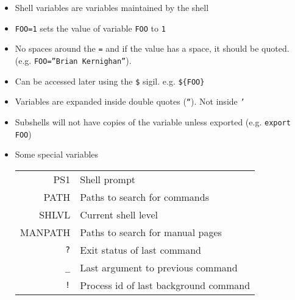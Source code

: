 \begin{itemize}
\item Shell variables are variables maintained by the shell
\item \texttt{FOO=1} sets the value of variable \texttt{FOO} to \texttt{1}
\item No spaces around the \texttt{=} and if the value has a space, it
  should be quoted. (e.g. \texttt{FOO=''Brian Kernighan''}).
\item Can be accessed later using the \texttt{\$} sigil. e.g. \texttt{\$\{FOO\}}
\item Variables are expanded inside double quotes (\texttt{``}). Not
  inside \texttt{'}
\item Subshells will not have copies of the variable unless exported
  (e.g. \texttt{export FOO})
\item Some special variables
  \begin{center}
    \begin{tabular}{ r  l }
      PS1 & Shell prompt \\
      PATH & Paths to search for commands \\
      SHLVL & Current shell level \\
      MANPATH & Paths to search for manual pages \\
      \texttt{?} & Exit status of last command \\
      \texttt{\_} & Last argument to previous command \\
      \texttt{!} & Process id of last background command \\
    \end {tabular}
  \end{center}
\end{itemize}
